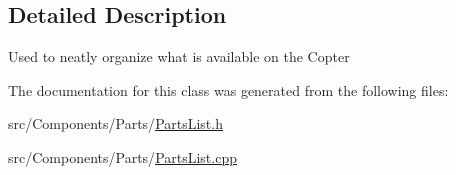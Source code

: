 \subsection{Detailed Description}
Used to neatly organize what is available on the Copter 

The documentation for this class was generated from the following files\+:\begin{DoxyCompactItemize}
\item 
src/\+Components/\+Parts/\hyperlink{PartsList_8h}{Parts\+List.\+h}\item 
src/\+Components/\+Parts/\hyperlink{PartsList_8cpp}{Parts\+List.\+cpp}\end{DoxyCompactItemize}

